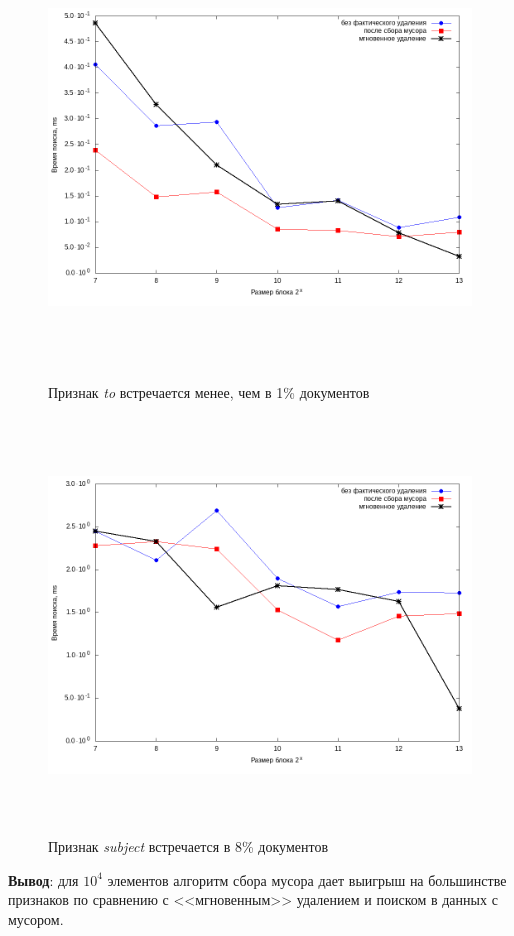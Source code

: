 \begin{figure}[H]
\includegraphics[width=\linewidth, height=11cm]{fig/limit_1e6/1e4/to.png}
\caption{Признак \textit{to} встречается менее, чем в 1\% документов}
\includegraphics[width=\linewidth, height=11cm]{fig/limit_1e6/1e4/subject.png}
\caption{Признак \textit{subject} встречается в 8\% документов}
\end{figure}

\textbf{Вывод}: для $10^4$ элементов алгоритм сбора мусора дает выигрыш на большинстве признаков
по сравнению с <<мгновенным>> удалением и поиском в данных с мусором.

